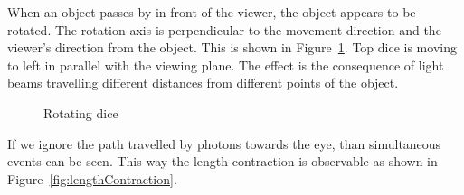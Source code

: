 \documentclass{egpubl}
\begin{document}
When an object passes by in front of the viewer, the object appears to be rotated. The rotation axis is perpendicular to the movement direction and the viewer's direction from the object. This is shown in Figure~\ref{fig:RotatingDice}. Top dice is moving to left in parallel with the viewing plane. The effect is the consequence of light beams travelling different distances from different points of the object.

\begin{figure}[h]
\center
{}
\caption{Rotating dice}
\label{fig:RotatingDice}
\end{figure}

If we ignore the path travelled by photons towards the eye, than simultaneous events can be seen. This way the length contraction is observable as shown in Figure~\ref{fig:lengthContraction}.
\end{document}
